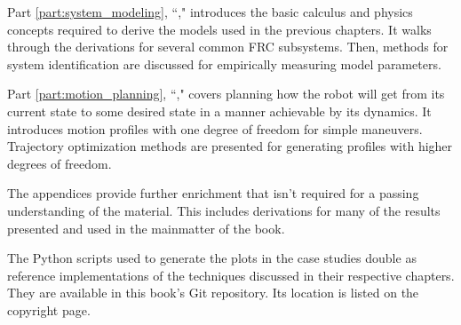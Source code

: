 Part \ref{part:system_modeling}, ``," introduces
the basic calculus and physics concepts required to derive the models used in
the previous chapters. It walks through the derivations for several common FRC
subsystems. Then, methods for system identification are discussed for
empirically measuring model parameters.

Part \ref{part:motion_planning}, ``," covers
planning how the robot will get from its current state to some desired state in
a manner achievable by its dynamics. It introduces motion profiles with one
degree of freedom for simple maneuvers. Trajectory optimization methods are
presented for generating profiles with higher degrees of freedom.

The appendices provide further enrichment that isn't required for a passing
understanding of the material. This includes derivations for many of the results
presented and used in the mainmatter of the book.

The Python scripts used to generate the plots in the case studies double as
reference implementations of the techniques discussed in their respective
chapters. They are available in this book's Git repository. Its location is
listed on the copyright page.
